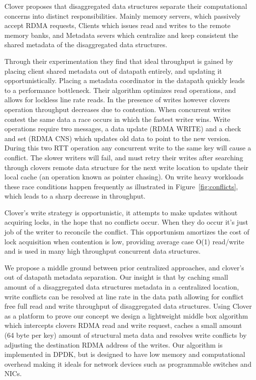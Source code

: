 Clover proposes that disaggregated data structures separate their
computational concerns into distinct responsibilities. Mainly memory
servers, which passively accept RDMA requests, Clients which issues read and
writes to the remote memory banks, and Metadata severs which
centralize and keep consistent the shared metadata of the disaggregated
data structures.

Through their experimentation they find that ideal throughput is
gained by placing client shared metadata out of datapath entirely, and
updating it opportunistically. Placing a metadata coordinator in the
datapath quickly leads to a performance bottleneck. Their algorithm
optimizes read operations, and allows for lockless line rate reads. In
the presence of writes however clovers operation throughput decreases
due to contention. When concurrent writes contest the same data a race
occurs in which the fastest writer wins. Write operations require two
messages, a data update (RDMA WRITE) and a check and set (RDMA CNS)
which updates old data to point to the new version. During this two
RTT operation any concurrent write to the same key will cause a
conflict. The slower writers will fail, and must retry their writes
after searching through clovers remote data structure for the next
write location to update their local cache (an operation known as
pointer chasing). On write heavy workloads these race conditions
happen frequently as illustrated in Figure~\ref{fig:conflicts}, which
leads to a sharp decrease in throughput.



Clover's write strategy is opportunistic, it attempts to make updates
without acquiring locks, in the hope that no conflicts occur. When
they do occur it's just job of the writer to reconcile the conflict.
This opportunism amortizes the cost of lock acquisition when
contention is low, providing average case O(1) read/write and is used
in many high throughput concurrent data structures.

We propose a middle ground between prior centralized approaches, and
clover's out of datapath metadata separation. Our insight is that by
caching small amount of a disaggregated data structures metadata in a
centralized location, write conflicts can be resolved at line rate in
the data path allowing for conflict free full read and write
throughput of disaggregated data structures. Using Clover as a
platform to prove our concept we design a lightweight middle box
algorithm which intercepts clovers RDMA read and write request, caches
a small amount (64 byte per key) amount of structural meta data and
resolves write conflicts by adjusting the destination RDMA address of
the writes. Our algorithm is implemented in DPDK, but is designed to
have low memory and computational overhead making it ideals for
network devices such as programmable switches and NICs.


